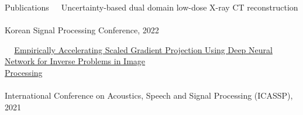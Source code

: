 \documentclass{resume} %
\newcommand{\mycolor}[1]{\textcolor{myurlcolor}{#1}}
\begin{document}
\begin{rSection}{Publications {}}
\textbullet~\,\, {\mycolor{Uncertainty-based dual domain low-dose X-ray CT reconstruction}}
\\ 
\\ \hspace*{1.5em}Korean Signal Processing Conference, 2022

\textbullet~\,\, \href{https://ieeexplore.ieee.org/document/9415023}{Empirically Accelerating Scaled Gradient Projection Using Deep Neural Network for Inverse Problems in Image \\ \hspace*{1.5em}Processing}
\\ 
\\ \hspace*{1.5em}International Conference on Acoustics, Speech and Signal Processing (ICASSP), 2021 \\
\end{rSection} 














\end{document}
